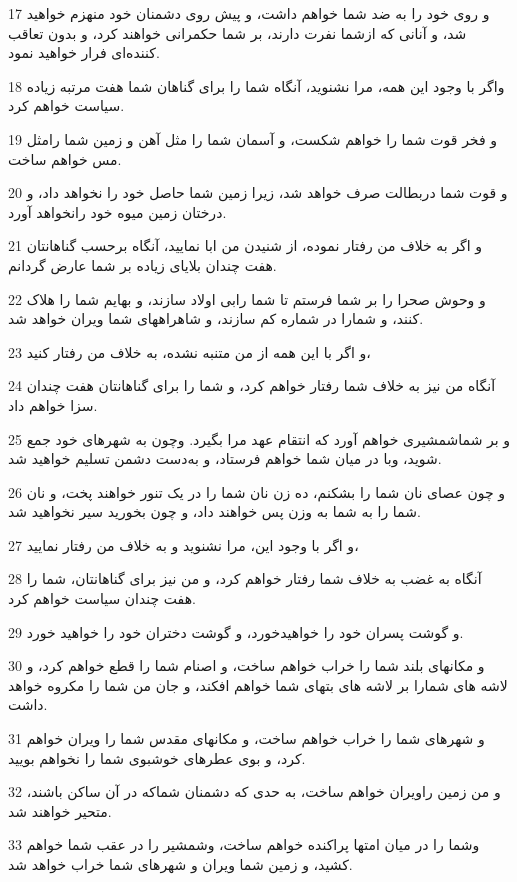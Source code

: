 \par 17 و روی خود را به ضد شما خواهم داشت، و پیش روی دشمنان خود منهزم خواهید شد، و آنانی که ازشما نفرت دارند، بر شما حکمرانی خواهند کرد، و بدون تعاقب کننده‌ای فرار خواهید نمود.
\par 18 واگر با وجود این همه، مرا نشنوید، آنگاه شما را برای گناهان شما هفت مرتبه زیاده سیاست خواهم کرد.
\par 19 و فخر قوت شما را خواهم شکست، و آسمان شما را مثل آهن و زمین شما رامثل مس خواهم ساخت.
\par 20 و قوت شما دربطالت صرف خواهد شد، زیرا زمین شما حاصل خود را نخواهد داد، و درختان زمین میوه خود رانخواهد آورد.
\par 21 و اگر به خلاف من رفتار نموده، از شنیدن من ابا نمایید، آنگاه برحسب گناهانتان هفت چندان بلایای زیاده بر شما عارض گردانم.
\par 22 و وحوش صحرا را بر شما فرستم تا شما رابی اولاد سازند، و بهایم شما را هلاک کنند، و شمارا در شماره کم سازند، و شاهراههای شما ویران خواهد شد.
\par 23 و اگر با این همه از من متنبه نشده، به خلاف من رفتار کنید،
\par 24 آنگاه من نیز به خلاف شما رفتار خواهم کرد، و شما را برای گناهانتان هفت چندان سزا خواهم داد.
\par 25 و بر شماشمشیری خواهم آورد که انتقام عهد مرا بگیرد. وچون به شهرهای خود جمع شوید، وبا در میان شما خواهم فرستاد، و به‌دست دشمن تسلیم خواهید شد.
\par 26 و چون عصای نان شما را بشکنم، ده زن نان شما را در یک تنور خواهند پخت، و نان شما را به شما به وزن پس خواهند داد، و چون بخورید سیر نخواهید شد.
\par 27 و اگر با وجود این، مرا نشنوید و به خلاف من رفتار نمایید،
\par 28 آنگاه به غضب به خلاف شما رفتار خواهم کرد، و من نیز برای گناهانتان، شما را هفت چندان سیاست خواهم کرد.
\par 29 و گوشت پسران خود را خواهیدخورد، و گوشت دختران خود را خواهید خورد.
\par 30 و مکانهای بلند شما را خراب خواهم ساخت، و اصنام شما را قطع خواهم کرد، و لاشه های شمارا بر لاشه های بتهای شما خواهم افکند، و جان من شما را مکروه خواهد داشت.
\par 31 و شهرهای شما را خراب خواهم ساخت، و مکانهای مقدس شما را ویران خواهم کرد، و بوی عطرهای خوشبوی شما را نخواهم بویید.
\par 32 و من زمین راویران خواهم ساخت، به حدی که دشمنان شماکه در آن ساکن باشند، متحیر خواهند شد.
\par 33 وشما را در میان امتها پراکنده خواهم ساخت، وشمشیر را در عقب شما خواهم کشید، و زمین شما ویران و شهرهای شما خراب خواهد شد.
